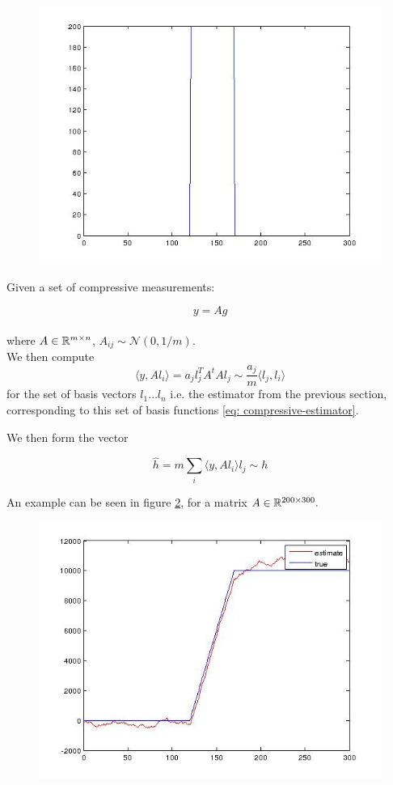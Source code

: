 \documentclass{article}
\begin{document}
\begin{figure}[h]
\centering
\includegraphics[height = 7.3 cm]{g.jpg}
\caption{}
\label{fig:rectangle}
\end{figure}

Given a set of compressive measurements: 

\begin{equation}
y = Ag
\end{equation}
\\
where \(A \in {\mathbb{R}}^{m \times n} \), \(A_{ij} \sim \mathcal{N}\left(0,1/m\right)\).
\\
We then compute 
\begin{equation}
\langle y, Al_i\rangle = a_j  l_j^TA^tAl_j \sim \frac{a_j}{m} \langle l_j, l_i \rangle
\end{equation}
for the set of basis vectors \(l_1 \ldots l_n\) i.e. the estimator from the previous section, corresponding to this set of basis functions \eqref{eq: compressive-estimator}. 

We then form the vector 

\begin{equation}
\hat{h} = m \sum_i \langle y, Al_i\rangle l_j \sim h
\label{ss-estimator}
\end{equation}

An example can be seen in figure \ref{fig:hhat}, for a matrix \(A \in {\mathbb{R}}^{200 \times 300}.\)

\begin{figure}[h]
\centering
\includegraphics[height = 7.3 cm]{hhat.jpg}
\caption{}
\label{fig:hhat}
\end{figure}
\end{document}
